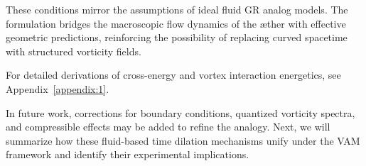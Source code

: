 These conditions mirror the assumptions of ideal fluid GR analog models. The formulation bridges the macroscopic flow dynamics of the æther with effective geometric predictions, reinforcing the possibility of replacing curved spacetime with structured vorticity fields.

For detailed derivations of cross-energy and vortex interaction energetics, see Appendix~\ref{appendix:1}.

In future work, corrections for boundary conditions, quantized vorticity spectra, and compressible effects may be added to refine the analogy. Next, we will summarize how these fluid-based time dilation mechanisms unify under the VAM framework and identify their experimental implications.
